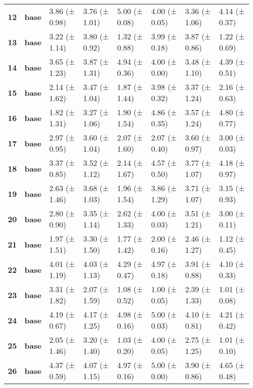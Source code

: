 \begin{longtable}{llllllll}
\cline{1-8}
\textbf{12} & \textbf{base} & 3.86 (± 0.98) & 3.76 (± 1.01) & 5.00 (± 0.08) & 4.00 (± 0.05) & 3.36 (± 1.06) & 4.14 (± 0.37) \\
\cline{1-8}
\textbf{13} & \textbf{base} & 3.22 (± 1.14) & 3.80 (± 0.92) & 1.32 (± 0.88) & 3.99 (± 0.18) & 3.87 (± 0.86) & 1.22 (± 0.69) \\
\cline{1-8}
\textbf{14} & \textbf{base} & 3.65 (± 1.23) & 3.87 (± 1.31) & 4.94 (± 0.36) & 4.00 (± 0.00) & 3.48 (± 1.10) & 4.39 (± 0.51) \\
\cline{1-8}
\textbf{15} & \textbf{base} & 2.14 (± 1.62) & 3.47 (± 1.04) & 1.87 (± 1.44) & 3.98 (± 0.32) & 3.37 (± 1.24) & 2.16 (± 0.63) \\
\cline{1-8}
\textbf{16} & \textbf{base} & 1.82 (± 1.31) & 3.27 (± 1.06) & 1.90 (± 1.54) & 4.86 (± 0.35) & 3.57 (± 1.24) & 4.80 (± 0.77) \\
\cline{1-8}
\textbf{17} & \textbf{base} & 2.97 (± 0.95) & 3.60 (± 1.04) & 2.07 (± 1.60) & 2.07 (± 0.40) & 3.60 (± 0.97) & 3.00 (± 0.03) \\
\cline{1-8}
\textbf{18} & \textbf{base} & 3.37 (± 0.85) & 3.52 (± 1.12) & 2.14 (± 1.67) & 4.57 (± 0.50) & 3.77 (± 1.07) & 4.18 (± 0.97) \\
\cline{1-8}
\textbf{19} & \textbf{base} & 2.63 (± 1.46) & 3.68 (± 1.03) & 1.96 (± 1.54) & 3.86 (± 1.29) & 3.71 (± 1.07) & 3.15 (± 0.93) \\
\cline{1-8}
\textbf{20} & \textbf{base} & 2.80 (± 0.90) & 3.35 (± 1.14) & 2.62 (± 1.33) & 4.00 (± 0.03) & 3.51 (± 1.21) & 3.00 (± 0.11) \\
\cline{1-8}
\textbf{21} & \textbf{base} & 1.97 (± 1.51) & 3.30 (± 1.50) & 1.77 (± 1.42) & 2.00 (± 0.16) & 2.46 (± 1.27) & 1.12 (± 0.45) \\
\cline{1-8}
\textbf{22} & \textbf{base} & 4.01 (± 1.19) & 4.03 (± 1.13) & 4.29 (± 0.47) & 4.97 (± 0.18) & 3.91 (± 0.88) & 4.10 (± 0.33) \\
\cline{1-8}
\textbf{23} & \textbf{base} & 3.31 (± 1.82) & 2.07 (± 1.59) & 1.08 (± 0.52) & 1.00 (± 0.05) & 2.39 (± 1.33) & 1.01 (± 0.08) \\
\cline{1-8}
\textbf{24} & \textbf{base} & 4.19 (± 0.67) & 4.17 (± 1.25) & 4.98 (± 0.16) & 5.00 (± 0.03) & 4.10 (± 0.81) & 4.21 (± 0.42) \\
\cline{1-8}
\textbf{25} & \textbf{base} & 2.05 (± 1.46) & 3.20 (± 1.40) & 1.03 (± 0.20) & 4.00 (± 0.05) & 2.75 (± 1.25) & 1.01 (± 0.10) \\
\cline{1-8}
\textbf{26} & \textbf{base} & 4.37 (± 0.59) & 4.07 (± 1.15) & 4.97 (± 0.16) & 5.00 (± 0.00) & 3.90 (± 0.86) & 4.65 (± 0.48) \\

\end{longtable}

